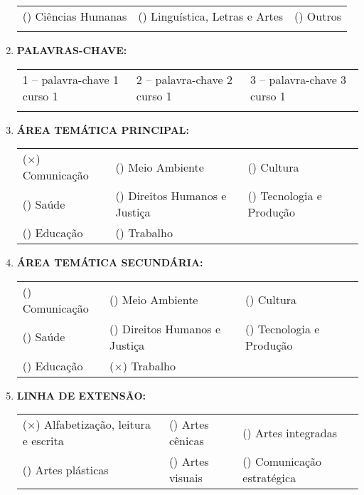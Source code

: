 \documentclass[12pt,a4paper,oneside]{article}%
\begin{document}
\begin{enumerate}
\begin{tabularx}{\linewidth}{|X|X|X|}
(\phantom{$\times$}) Ciências Humanas &(\phantom{$\times$}) Linguística, Letras e Artes &(\phantom{$\times$}) Outros \\%
&&\\%
\hline%
\end{tabularx}%
\item%
\textbf{PALAVRAS{-}CHAVE: }%
\newline%
\begin{tabularx}{\linewidth}{|X|X|X|}%
\hline%
1 -- palavra-chave 1 curso 1&2 -- palavra-chave 2 curso 1&3 -- palavra-chave 3 curso 1\\%
&&\\%
\hline%
\end{tabularx}%
\item%
\textbf{ÁREA TEMÁTICA PRINCIPAL: }%
\newline%
\begin{tabularx}{\linewidth}{|X|X|X|}%
\hline%
($\times$) Comunicação&(\phantom{$\times$}) Meio Ambiente &(\phantom{$\times$}) Cultura \\%
(\phantom{$\times$}) Saúde &(\phantom{$\times$}) Direitos Humanos e Justiça &(\phantom{$\times$}) Tecnologia e Produção \\%
(\phantom{$\times$}) Educação &(\phantom{$\times$}) Trabalho &\\%
\hline%
\end{tabularx}%
\item%
\textbf{ÁREA TEMÁTICA SECUNDÁRIA: }%
\newline%
\begin{tabularx}{\linewidth}{|X|X|X|}%
\hline%
(\phantom{$\times$}) Comunicação &(\phantom{$\times$}) Meio Ambiente &(\phantom{$\times$}) Cultura \\%
(\phantom{$\times$}) Saúde &(\phantom{$\times$}) Direitos Humanos e Justiça &(\phantom{$\times$}) Tecnologia e Produção \\%
(\phantom{$\times$}) Educação &($\times$) Trabalho&\\%
\hline%
\end{tabularx}%
\newpage%
\item%
\textbf{LINHA DE EXTENSÃO: }%
\newline%
\newline%
{\tiny%
\begin{tabularx}{\linewidth}{X|X|X}%
($\times$) Alfabetização, leitura e escrita&(\phantom{$\times$}) Artes cênicas &(\phantom{$\times$}) Artes integradas \\%
(\phantom{$\times$}) Artes plásticas &(\phantom{$\times$}) Artes visuais &(\phantom{$\times$}) Comunicação estratégica \\%

\end{tabularx}}
\end{enumerate}
\end{document}
